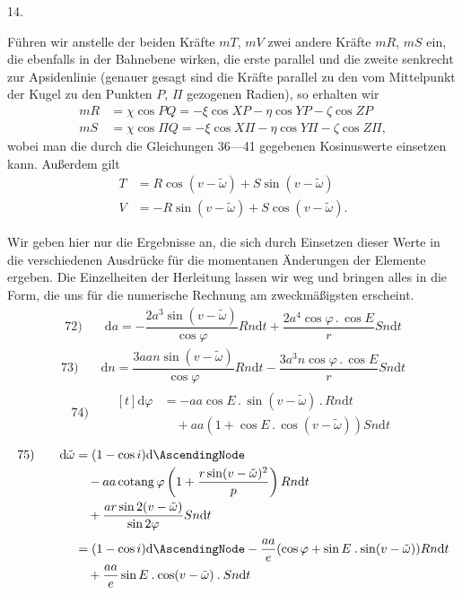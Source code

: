 \par{}\bigskip
{}
\begin{center}14.\end{center}
\noindent\hspace*{\parindent}Führen wir anstelle der beiden Kräfte \(mT\), \(mV\) zwei andere Kräfte \(mR\), \(mS\) ein, die ebenfalls in der Bahnebene wirken, die erste parallel und die zweite senkrecht zur Apsidenlinie (genauer gesagt sind die Kräfte parallel zu den vom Mittelpunkt der Kugel zu den Punkten \(P\), \(\Pi\) gezogenen Radien), so erhalten wir
\[
\begin{aligned}
mR&=\chi\cos PQ=-\xi\cos XP-\eta\cos YP-\zeta\cos ZP\\
mS&=\chi\cos\Pi Q=-\xi\cos X\Pi-\eta\cos Y\Pi-\zeta\cos Z\Pi,
\end{aligned}
\]
wobei man die durch die Gleichungen 36—41 gegebenen Kosinuswerte einsetzen kann. Außerdem gilt
\[
\begin{aligned}
T&=R\cos(v-\tilde\omega)+S\sin(v-\tilde\omega)\\
V&=-R\sin(v-\tilde\omega)+S\cos(v-\tilde\omega).
\end{aligned}
\]
\par Wir geben hier nur die Ergebnisse an, die sich durch Einsetzen dieser Werte in die verschiedenen Ausdrücke für die momentanen Änderungen der Elemente ergeben. Die Einzelheiten der Herleitung lassen wir weg und bringen alles in die Form, die uns für die numerische Rechnung am zweckmäßigsten erscheint.
\[
\begin{array}{rl}
72)\quad&\mathrm{d}a=-\dfrac{2a^3\sin(v-\tilde\omega)}{\cos\varphi}Rn\mathrm{d}t+\dfrac{2a^4\cos\varphi\mathbin{.}\cos E}{r}Sn\mathrm{d}t
\end{array}
\]
\[
\begin{array}{rl}
73)\quad&\mathrm{d}n=\dfrac{3aan\sin(v-\tilde\omega)}{\cos\varphi}Rn\mathrm{d}t-\dfrac{3a^3n\cos\varphi\mathbin{.}\cos E}{r}Sn\mathrm{d}t
\end{array}
\]
\[
\begin{array}{rl}
74)\quad&\begin{aligned}[t]\mathrm{d}\varphi&=-aa\cos E\mathbin{.}\sin(v-\tilde\omega)\mathbin{.}Rn\mathrm{d}t\\
&\quad+aa(1+\cos E\mathbin{.}\cos(v-\tilde\omega))Sn\mathrm{d}t\end{aligned}
\end{array}
\]
\[
\begin{array}{rl}
75)\quad&\begin{aligned}[t]\mathrm{d}\tilde\omega&=(1-\cos i)\mathrm{d}\AscendingNode\\
&\quad-aa\operatorname{cotang}\varphi\left(1+\dfrac{r\sin(v-\tilde\omega)^2}{p}\right)Rn\mathrm{d}t\\
&\quad+\dfrac{ar\sin2(v-\tilde\omega)}{\sin2\varphi}Sn\mathrm{d}t\\[4pt]
&=(1-\cos i)\mathrm{d}\AscendingNode-\dfrac{aa}{e}(\cos\varphi+\sin E\mathbin{.}\sin(v-\tilde\omega))Rn\mathrm{d}t\\
&\quad+\dfrac{aa}{e}\sin E\mathbin{.}\cos(v-\tilde\omega)\mathbin{.}Sn\mathrm{d}t\end{aligned}
\end{array}
\]
